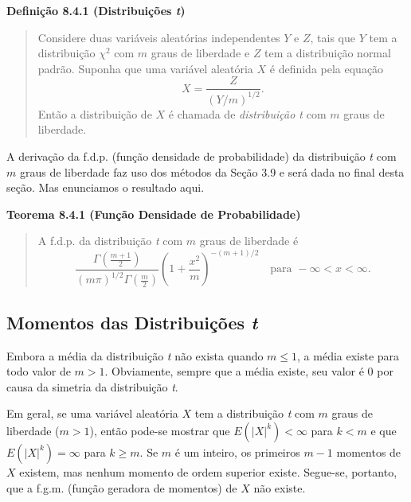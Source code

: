 \vspace{1em}
\noindent\textbf{Definição 8.4.1 (Distribuições \textit{t})}
\begin{quote}
    Considere duas variáveis aleatórias independentes $Y$ e $Z$, tais que $Y$ tem a distribuição $\chi^2$ com $m$ graus de liberdade e $Z$ tem a distribuição normal padrão. Suponha que uma variável aleatória $X$ é definida pela equação
    \begin{equation} \label{eq:8.4.1}
        X = \frac{Z}{(Y/m)^{1/2}}.
    \end{equation}
    Então a distribuição de $X$ é chamada de \textit{distribuição t} com $m$ graus de liberdade.
\end{quote}
\vspace{1em}

A derivação da f.d.p. (função densidade de probabilidade) da distribuição \textit{t} com $m$ graus de liberdade faz uso dos métodos da Seção 3.9 e será dada no final desta seção. Mas enunciamos o resultado aqui.

\vspace{1em}
\noindent\textbf{Teorema 8.4.1 (Função Densidade de Probabilidade)}
\begin{quote}
    A f.d.p. da distribuição \textit{t} com $m$ graus de liberdade é
    \begin{equation} \label{eq:8.4.2}
        \frac{\Gamma\left(\frac{m+1}{2}\right)}{(m\pi)^{1/2}\Gamma\left(\frac{m}{2}\right)} \left(1 + \frac{x^2}{m}\right)^{-(m+1)/2} \quad \text{para } -\infty < x < \infty.
    \end{equation}
\end{quote}
\vspace{1em}

\subsection*{Momentos das Distribuições \textit{t}}

Embora a média da distribuição \textit{t} não exista quando $m \le 1$, a média existe para todo valor de $m > 1$. Obviamente, sempre que a média existe, seu valor é 0 por causa da simetria da distribuição \textit{t}.

Em geral, se uma variável aleatória $X$ tem a distribuição \textit{t} com $m$ graus de liberdade ($m > 1$), então pode-se mostrar que $E(|X|^k) < \infty$ para $k < m$ e que $E(|X|^k) = \infty$ para $k \ge m$. Se $m$ é um inteiro, os primeiros $m-1$ momentos de $X$ existem, mas nenhum momento de ordem superior existe. Segue-se, portanto, que a f.g.m. (função geradora de momentos) de $X$ não existe.

